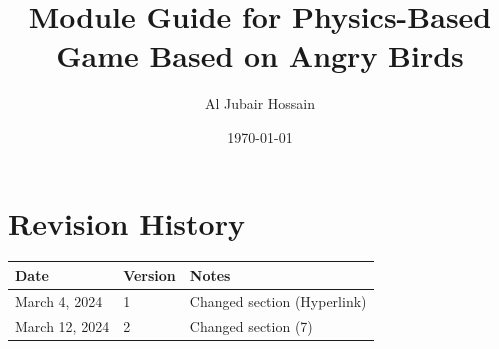 \documentclass[12pt, titlepage]{article}
\newcommand{\progname}[1]{#1}
\begin{document}
\title{Module Guide for \progname{Physics-Based Game Based on Angry Birds}} 
\author{Al Jubair Hossain}
\date{\today}

\maketitle


\section{Revision History}

\begin{tabularx}{\textwidth}{p{3cm}p{2cm}X}
\toprule {\bf Date} & {\bf Version} & {\bf Notes}\\
\midrule
March 4, 2024 & 1 & Changed section (Hyperlink)\\
March 12, 2024 & 2 & Changed section (7)\\
\bottomrule
\end{tabularx}

\newpage




\end{document}
